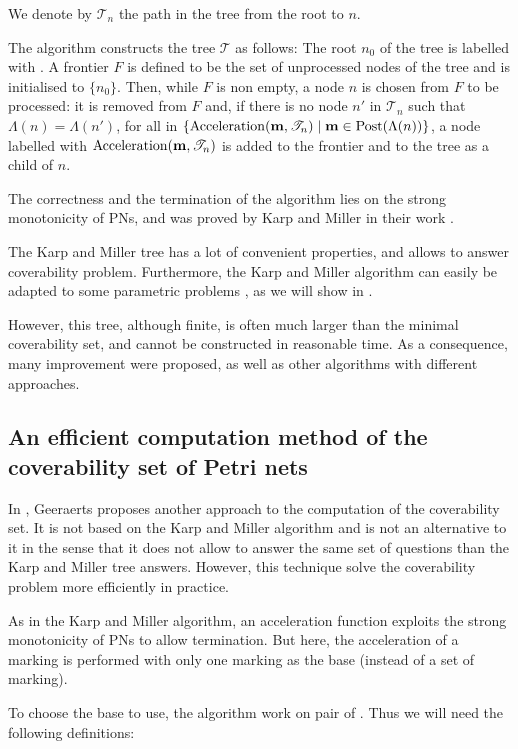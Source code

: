We denote by $\mathscr{T}_n$ the path in the tree from the root to $n$.

The algorithm constructs the tree $\mathcal{T}$ as follows:
The root $n_0$ of the tree is labelled with \marqi.
A frontier $F$ is defined to be the set of unprocessed nodes of the tree and is initialised to $\{n_0\}$.
Then, while $F$ is non empty, a node $n$ is chosen from $F$ to be processed:
it is removed from $F$ and, if there is no node $n'$ in $\mathscr{T}_n$ such that $\Lambda(n) = \Lambda(n')$, for all \omark in $\{\operatorname{Acceleration}(\mathbf{m}, \mathscr{T}_n) \mid \mathbf{m} \in \operatorname{Post}(\Lambda(n))\}$, a node labelled with $\operatorname{Acceleration}(\mathbf{m}, \mathscr{T}_n)$ is added to the frontier and to the tree as a child of $n$.

The correctness and the termination of the algorithm lies on the strong monotonicity of \acp{PN}, and was proved by Karp and Miller in their work \cite{Karp69}.

The Karp and Miller tree has a lot of convenient properties, and allows to answer coverability problem. 
Furthermore, the Karp and Miller algorithm can easily be adapted to some parametric problems \cite{David17}, as we will show in .

However, this tree, although finite, is often much larger than the minimal coverability set, and cannot be constructed in reasonable time.
As a consequence, many improvement were proposed, as well as other algorithms with different approaches.

\subsection{An efficient computation method of the coverability set of Petri nets}
\label{sec:eff}

In \cite{Geeraerts07thesis, Geeraerts07}, Geeraerts proposes another approach to the computation of the coverability set.
It is not based on the Karp and Miller algorithm and is not an alternative to it in the sense that it does not allow to answer the same set of questions than the Karp and Miller tree answers.
However, this technique solve the coverability problem more efficiently in practice.

As in the Karp and Miller algorithm, an acceleration function exploits the strong monotonicity of \acp{PN} to allow termination.
But here, the acceleration of a marking is performed with only one marking as the base (instead of a set of marking).

To choose the base to use, the algorithm work on pair of \omarks.
Thus we will need the following definitions:

